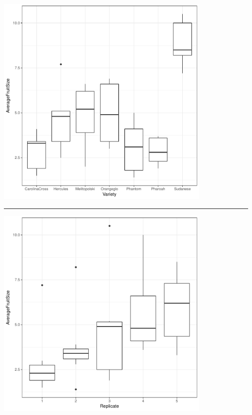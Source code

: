 \documentclass[a4paper, 10pt, fleqn, twosided]{memoir}
\begin{document}
\begin{tcolorbox}[title = Exercise 3 output]
\includegraphics[width=0.8\textwidth, frame]{Exercise3Var_boxplot.pdf}
\vspace{0.1cm}

{\color{outpt} {\hrule height 1pt}}

\vspace{0.1cm}


\includegraphics[width=0.8\textwidth, frame]{Exercise3Blk_boxplot.pdf}
\end{tcolorbox}
\end{document}
